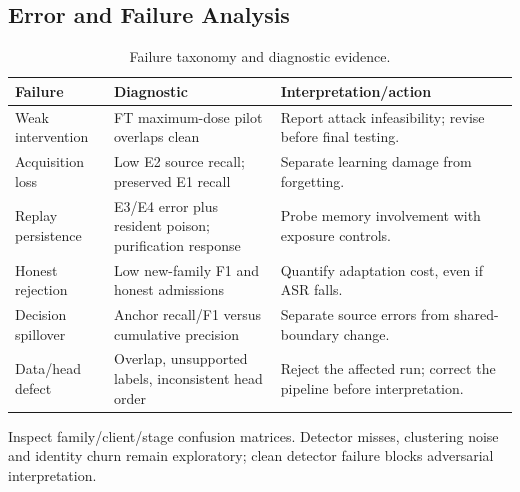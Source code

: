 \documentclass[10pt,a4paper]{article}
\begin{document}
\subsection{Error and Failure Analysis}
\begin{table}[htbp]
\centering\footnotesize
\caption{Failure taxonomy and diagnostic evidence.}
\label{tab:failure}
\begin{tabularx}{\linewidth}{L{2.3cm}Y Y}
\toprule
Failure & Diagnostic & Interpretation/action\\
\midrule
Weak intervention & FT maximum-dose pilot overlaps clean & Report attack infeasibility; revise before final testing.\\
Acquisition loss & Low E2 source recall; preserved E1 recall & Separate learning damage from forgetting.\\
Replay persistence & E3/E4 error plus resident poison; purification response & Probe memory involvement with exposure controls.\\
Honest rejection & Low new-family F1 and honest admissions & Quantify adaptation cost, even if ASR falls.\\
Decision spillover & Anchor recall/F1 versus cumulative precision & Separate source errors from shared-boundary change.\\
Data/head defect & Overlap, unsupported labels, inconsistent head order & Reject the affected run; correct the pipeline before interpretation.\\
\bottomrule
\end{tabularx}
\end{table}
Inspect family/client/stage confusion matrices. Detector misses, clustering noise and identity churn remain exploratory; clean detector failure blocks adversarial interpretation.
\end{document}
